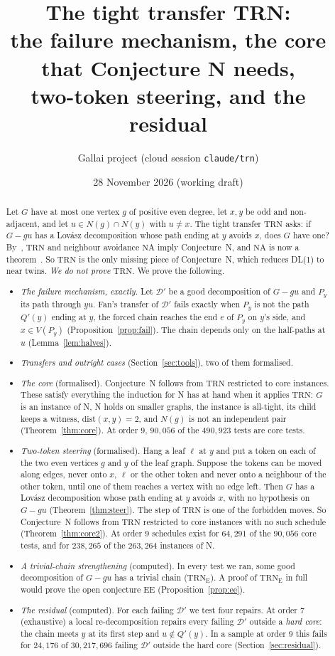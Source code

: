 \documentclass[11pt]{amsart}
\title[The tight transfer TRN]{The tight transfer TRN:\\ the failure mechanism, the core that
Conjecture N needs,\\ two-token steering, and the residual}
\author{Gallai project (cloud session \texttt{claude/trn})}
\date{28 November 2026 (working draft)}
\theoremstyle{definition}
\newcommand{\cD}{\mathcal D}
\newcommand{\TRN}{\mathrm{TRN}}
\newcommand{\TRNE}{\mathrm{TRN}_{\mathrm E}}
\newcommand{\NA}{\mathrm{NA}}
\begin{document}
\begin{abstract}
Let $G$ have at most one vertex $g$ of positive even degree, let $x,y$ be odd and non-adjacent,
and let $u\in N(g)\cap N(y)$ with $u\ne x$. The tight transfer $\TRN$ asks: if $G-gu$ has a
Lov\'asz decomposition whose path ending at $y$ avoids $x$, does $G$ have one? By~\cite{CN},
$\TRN$ and neighbour avoidance $\NA$ imply Conjecture~N, and $\NA$ is now a theorem~\cite{NA}. So
$\TRN$ is the only missing piece of Conjecture~N, which reduces DL(1) to near twins. \emph{We do
not prove $\TRN$.} We prove the following.
\begin{itemize}
\item \emph{The failure mechanism, exactly.} Let $\cD'$ be a good decomposition of $G-gu$ and $P_y$
its path through $yu$. Fan's transfer of $\cD'$ fails exactly when $P_y$ is not the path
$Q'(y)$ ending at $y$, the forced chain reaches the end $e$ of $P_y$ on $y$'s side, and $x\in
V(P_y)$ (Proposition~\ref{prop:fail}). The chain depends only on the half-paths at $u$
(Lemma~\ref{lem:halves}).
\item \emph{Transfers and outright cases} (Section~\ref{sec:tools}), two of them formalised.
\item \emph{The core} (formalised). Conjecture~N follows from $\TRN$ restricted to core instances.
These satisfy everything the induction for N has at hand when it applies $\TRN$: $G$ is an instance
of N, N holds on smaller graphs, the instance is all-tight, its child keeps a witness,
$\mathrm{dist}(x,y)=2$, and $N(g)$ is not an independent pair (Theorem~\ref{thm:core}). At order
$9$, $90{,}056$ of the $490{,}923$ tests are core tests.
\item \emph{Two-token steering} (formalised). Hang a leaf $\ell$ at $y$ and put a token on each of
the two even vertices $g$ and $y$ of the leaf graph. Suppose the tokens can be moved along edges,
never onto $x$, $\ell$ or the other token and never onto a neighbour of the other token, until one of
them reaches a vertex with no edge left. Then $G$ has a Lov\'asz decomposition whose path ending at $y$ avoids $x$,
with no hypothesis on $G-gu$ (Theorem~\ref{thm:steer}). The step of $\TRN$ is one of the forbidden
moves. So Conjecture~N follows from $\TRN$ restricted to core instances with no such schedule
(Theorem~\ref{thm:core2}). At order $9$ schedules exist for $64{,}291$ of the $90{,}056$ core tests,
and for $238{,}265$ of the $263{,}264$ instances of N.
\item \emph{A trivial-chain strengthening} (computed). In every test we ran, some good
decomposition of $G-gu$ has a trivial chain ($\TRNE$). A proof of $\TRNE$ in full would prove the
open conjecture EE (Proposition~\ref{prop:ee}).
\item \emph{The residual} (computed). For each failing $\cD'$ we test four repairs. At order $7$
(exhaustive) a local re-decomposition repairs every failing $\cD'$ outside a \emph{hard core}: the
chain meets $y$ at its first step and $u\notin Q'(y)$. In a sample at order $9$ this fails for
$24{,}176$ of $30{,}217{,}696$ failing $\cD'$ outside the hard core (Section~\ref{sec:residual}).
\end{itemize}
\end{abstract}
\end{document}

